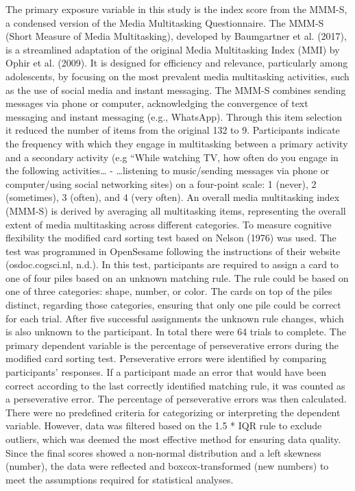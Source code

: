 \documentclass[
  man]{apa7}
\begin{document}
The primary exposure variable in this study is the index score from the MMM-S, a condensed version of the Media Multitasking Questionnaire. The MMM-S (Short Measure of Media Multitasking), developed by Baumgartner et al. (2017), is a streamlined adaptation of the original Media Multitasking Index (MMI) by Ophir et al. (2009). It is designed for efficiency and relevance, particularly among adolescents, by focusing on the most prevalent media multitasking activities, such as the use of social media and instant messaging. The MMM-S combines sending messages via phone or computer, acknowledging the convergence of text messaging and instant messaging (e.g., WhatsApp). Through this item selection it reduced the number of items from the original 132 to 9. Participants indicate the frequency with which they engage in multitasking between a primary activity and a secondary activity (e.g ``While watching TV, how often do you engage in the following activities\ldots{} - \ldots listening to music/sending messages via phone or computer/using social networking sites) on a four-point scale: 1 (never), 2 (sometimes), 3 (often), and 4 (very often). An overall media multitasking index (MMM-S) is derived by averaging all multitasking items, representing the overall extent of media multitasking across different categories. To measure cognitive flexibility the modified card sorting test based on Nelson (1976) was used. The test was programmed in OpenSesame following the instructions of their website (osdoc.cogsci.nl, n.d.). In this test, participants are required to assign a card to one of four piles based on an unknown matching rule. The rule could be based on one of three categories: shape, number, or color. The cards on top of the piles distinct, regarding those categories, ensuring that only one pile could be correct for each trial. After five successful assignments the unknown rule changes, which is also unknown to the participant. In total there were 64 trials to complete. The primary dependent variable is the percentage of perseverative errors during the modified card sorting test. Perseverative errors were identified by comparing participants' responses. If a participant made an error that would have been correct according to the last correctly identified matching rule, it was counted as a perseverative error. The percentage of perseverative errors was then calculated. There were no predefined criteria for categorizing or interpreting the dependent variable. However, data was filtered based on the 1.5 * IQR rule to exclude outliers, which was deemed the most effective method for ensuring data quality. Since the final scores showed a non-normal distribution and a left skewness (number), the data were reflected and boxcox-transformed (new numbers) to meet the assumptions required for statistical analyses.
\end{document}
